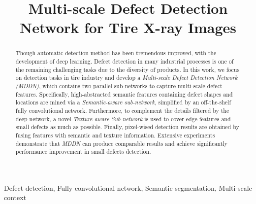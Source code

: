 \documentclass{article}
\title{Multi-scale Defect Detection Network for Tire X-ray Images}
\begin{document}

\maketitle

\begin{abstract}
Though automatic detection method has been tremendous improved, with the development of deep learning. Defect detection in many industrial processes is one of the remaining challenging tasks due to the diversity of products. In this work, we focus on detection tasks in tire industry and develop a {\it Multi-scale Defect Detection Network (MDDN)}, which contains two parallel sub-networks to capture multi-scale defect features. Specifically, high-abstracted semantic features containing defect shapes and locations are mined via a {\it Semantic-aware sub-network}, simplified by an off-the-shelf fully convolutional network. Furthermore, to complement the details filtered by the deep network, a novel {\it Texture-aware Sub-network} is used to cover edge features and small defects as much as possible. Finally, pixel-wised detection results are obtained by fusing features with semantic and texture information. Extensive experiments demonstrate that {\it MDDN} can produce comparable results and achieve significantly performance improvement in small defects detection.
\end{abstract}

\begin{keywords}
Defect detection, Fully convolutional network, Semantic segmentation, Multi-scale context
\end{keywords}
\end{document}
